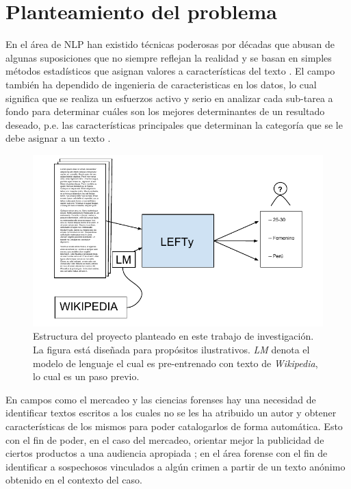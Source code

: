 \section{Planteamiento del problema}

En el área de NLP han existido técnicas poderosas por décadas que abusan de algunas suposiciones que no siempre reflejan la realidad y se basan en simples métodos estadísticos que asignan valores a características del texto \parencite{Edmundson1969, kupiec1995trainable}. El campo también ha dependido de \gls{ingenieria de caracteristicas} en los datos, lo cual significa que se realiza un esfuerzos activo y serio en analizar cada sub-tarea a fondo para determinar cuáles son los mejores determinantes de un resultado deseado, p.e. las características principales que determinan la categoría que se le debe asignar a un texto \parencite{aggarwal2012mining}.

\begin{figure}
\includegraphics[scale=1.0]{Figures/projectstruct.pdf}
\caption{Estructura del proyecto planteado en este trabajo de investigación. La figura está diseñada para propósitos ilustrativos. \textit{LM} denota el modelo de lenguaje el cual es pre-entrenado con texto de \textit{Wikipedia}, lo cual es un paso previo.}
\label{fig:projstruct}
\end{figure}

En campos como el mercadeo y las ciencias forenses hay una necesidad de identificar textos escritos a los cuales no se les ha atribuido un autor y obtener características de los mismos para poder catalogarlos de forma automática. Esto con el fin de poder, en el caso del mercadeo, orientar mejor la publicidad de ciertos productos a una audiencia apropiada \parencite{aggarwal2012mining}; en el área forense con el fin de identificar a sospechosos vinculados a algún crimen a partir de un texto anónimo obtenido en el contexto del caso.

